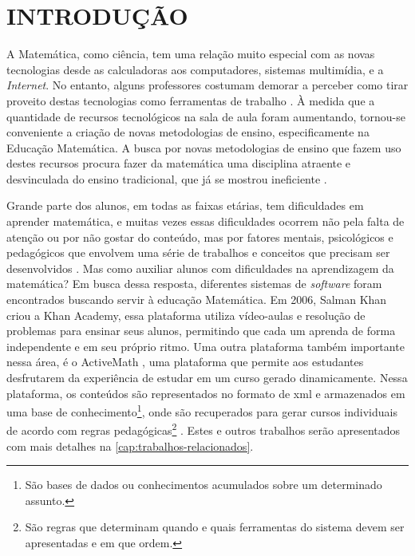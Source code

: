 \chapter{INTRODUÇÃO}
\label{cap:introducao}

A Matemática, como ciência, tem uma relação muito especial com as novas tecnologias desde as calculadoras aos computadores, sistemas 
multim\'idia, e a \textit{Internet}. No entanto, alguns professores costumam demorar a perceber como tirar proveito destas tecnologias como 
ferramentas de trabalho \cite{da1997ensino}. \`A medida que a quantidade de recursos tecnológicos na sala de aula foram aumentando, 
tornou-se conveniente a criação de novas metodologias de ensino, especificamente na Educação Matemática. A busca por novas 
metodologias de ensino que fazem uso destes recursos procura fazer da matemática uma disciplina atraente e desvinculada do ensino 
tradicional, que já se mostrou ineficiente \cite{silva2009ambiente}.

Grande parte dos alunos, em todas as faixas etárias, tem dificuldades em aprender matemática, e muitas vezes essas dificuldades ocorrem não pela falta de atenção ou por não gostar do conteúdo, mas por fatores mentais, psicológicos e pedag\'ogicos que envolvem uma série de trabalhos e conceitos que precisam ser desenvolvidos \cite{de2006dificuldades}. Mas como auxiliar alunos com dificuldades na aprendizagem da matemática? Em busca dessa resposta, diferentes sistemas de \textit{software} foram encontrados buscando servir \`a  educação Matem\'atica. Em 2006, Salman Khan criou a Khan Academy, essa plataforma utiliza vídeo-aulas e resolução de problemas para ensinar seus alunos, permitindo que cada um aprenda de forma independente e em seu pr\'oprio ritmo. Uma outra plataforma também  importante nessa área, \'e o ActiveMath \cite{melis2001activemath}, uma plataforma que permite aos estudantes desfrutarem da experiência de estudar em um curso gerado dinamicamente. Nessa plataforma, os conte\'udos s\~ao representados no formato de \gls{xml} \cite{bray1998extensible} e armazenados em uma base de conhecimento\footnote{São bases de dados ou conhecimentos acumulados sobre um determinado assunto.}, onde s\~ao recuperados para gerar cursos individuais de acordo com regras 
pedagógicas\footnote{S\~ao regras que determinam quando e quais ferramentas do sistema devem ser apresentadas e em que ordem.} 
\cite{melis2004activemath}. Estes e outros trabalhos serão apresentados com mais detalhes na \autoref{cap:trabalhos-relacionados}.

